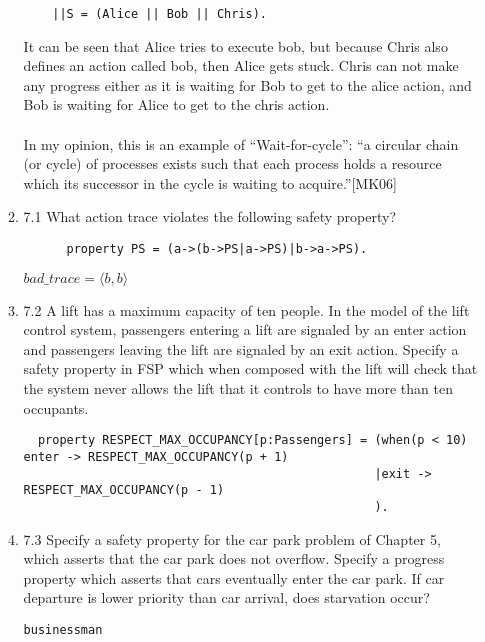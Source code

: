 \documentclass{article}
\begin{document}
\begin{enumerate}
\begin{enumerate}
\begin{verbatim}
    ||S = (Alice || Bob || Chris).
\end{verbatim}
    It can be seen that Alice tries to execute bob, but because Chris also defines an action called bob, then Alice gets stuck.
    Chris can not make any progress either as it is waiting for Bob to get to the alice action, and Bob is waiting for Alice to get to the chris action. \\
    \\
    In my opinion, this is an example of ``Wait-for-cycle'': ``a circular chain (or cycle) of processes exists such that each process holds a resource which its successor in the cycle is waiting to acquire.''[MK06]\\
  \item 7.1 
    What action trace violates the following safety property?
    \begin{verbatim}
      property PS = (a->(b->PS|a->PS)|b->a->PS). 
   \end{verbatim}
   $bad\_trace = \langle b, b \rangle$ \\ 
  \item 7.2 
    A lift has a maximum capacity of ten people. In the model of the lift control system, passengers entering a lift are signaled by an enter action and passengers leaving the lift are signaled by an exit action. Specify a safety property in FSP which when composed with the lift will check that the system never allows the lift that it controls to have more than ten occupants. \\
\begin{verbatim}
  property RESPECT_MAX_OCCUPANCY[p:Passengers] = (when(p < 10) enter -> RESPECT_MAX_OCCUPANCY(p + 1)
                                                 |exit -> RESPECT_MAX_OCCUPANCY(p - 1)
                                                 ).
  \end{verbatim}
  \item 7.3 
   Specify a safety property for the car park problem of Chapter 5, which asserts that the car park does not overflow. Specify a progress property which asserts that cars eventually enter the car park. If car departure is lower priority than car arrival, does starvation occur? \\
\begin{verbatim}
businessman
\end{verbatim}
\end{enumerate}


\end{enumerate}
\end{document}
